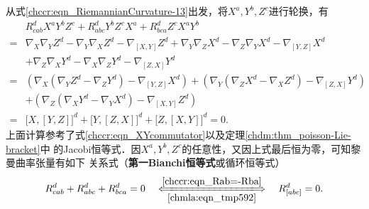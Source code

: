 从式\eqref{chccr:eqn_RiemannianCurvature-13}出发，将$X^a,Y^b,Z^c$进行轮换，有
\begin{align*}
    &R_{cab}^d{X^a}{Y^b}{Z^c} + R_{abc}^d{Y^b}{Z^c}{X^a}+R_{bca}^d{Z^c}{X^a}{Y^b} \\
    =& {\nabla _X}{\nabla _Y}{Z^d} - {\nabla _Y}{\nabla _X}{Z^d} - {\nabla _{[X,Y]}}{Z^d}
      +{\nabla _Y}{\nabla _Z}{X^d} - {\nabla _Z}{\nabla _Y}{X^d} - {\nabla _{[Y,Z]}}{X^d} \\
     &+{\nabla _Z}{\nabla _X}{Y^d} - {\nabla _X}{\nabla _Z}{Y^d} - {\nabla _{[Z,X]}}{Y^d} \\
    =&\left({\nabla _X}({\nabla _Y}{Z^d}-{\nabla _Z}{Y^d}) - {\nabla _{[Y,Z]}}{X^d} \right)
     +\left({\nabla _Y}({\nabla _Z}{X^d}-{\nabla _X}{Z^d}) - {\nabla _{[Z,X]}}{Y^d} \right) \\
    &+\left({\nabla _Z}({\nabla _X}{Y^d}-{\nabla _Y}{X^d}) - {\nabla _{[X,Y]}}{Z^d} \right) \\
    =& \bigl[X, [Y,Z]\bigr]^d+\bigl[Y, [Z,X]\bigr]^d +\bigl[Z, [X,Y]\bigr]^d=0.
\end{align*}
上面计算参考了式\eqref{chccr:eqn_XYcommutator}以及定理\ref{chdm:thm_poisson-Lie-bracket}中
的Jacobi恒等式．因$X^a,Y^b,Z^c$的任意性，又因上式最后恒为零，可知黎曼曲率张量有如下
关系式（{\heiti\bfseries 第一Bianchi恒等式}或{\heiti 循环恒等式}）
\begin{equation}\label{chccr:eqn_Bianchi-I-global}
    R_{cab}^d + R_{abc}^d + R_{bca}^d = 0 \quad 
    \xLongleftrightarrow[\ref{chmla:eqn_tmp592}]{\ref{chccr:eqn_Rab=-Rba}} \quad
    R_{[abc]}^d = 0.
\end{equation}


